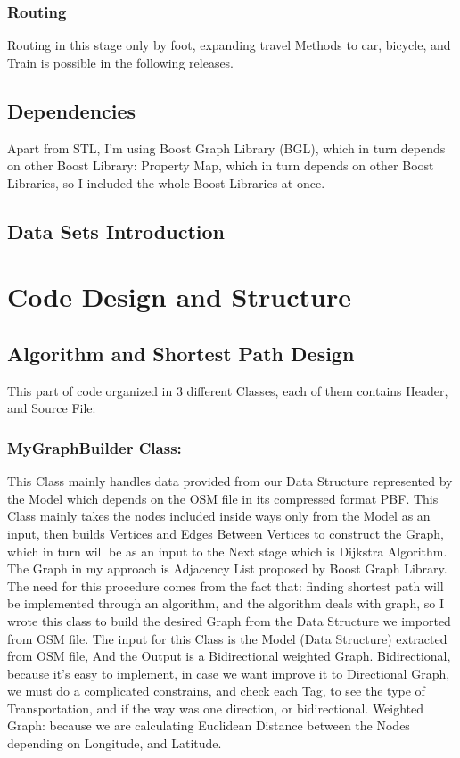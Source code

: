 \documentclass[a4paper,english]{book}
\begin{document}
\subsection{Routing}
Routing in this stage only by foot, expanding travel Methods to car, bicycle, and Train is possible in the following releases. 
\section{Dependencies}
Apart from STL, I’m using Boost Graph Library (BGL), which in turn depends on other Boost Library: Property Map, which in turn depends on other Boost Libraries, so I included the whole Boost Libraries at once.
\section{Data Sets Introduction}







\chapter{Code Design and Structure}
\section{Algorithm and Shortest Path Design}
This part of code organized in 3 different Classes, each of them contains Header, and Source File:
\subsection{ MyGraphBuilder Class:}
This Class mainly handles data provided from our Data Structure represented by the Model which depends on the OSM file in its compressed format PBF.
This Class mainly takes the nodes included inside ways only from the
Model as an input, then builds Vertices and Edges Between Vertices to construct the Graph, which in turn will be as an input to the Next stage which is Dijkstra Algorithm.
The Graph in my approach is Adjacency List proposed by Boost Graph Library.
The need for this procedure comes from the fact that: finding shortest path will be implemented through an algorithm, and the algorithm deals with graph, so I wrote this class to build the desired Graph from the Data Structure we imported from OSM file.
The input for this Class is the Model (Data Structure) extracted from OSM file, 
And the Output is a Bidirectional weighted Graph.
Bidirectional, because it’s easy to implement, in case we want improve it to Directional Graph, we must do a complicated constrains, and check each Tag, to see the type of Transportation, and if the way was one direction, or bidirectional.
Weighted Graph: because we are calculating Euclidean Distance between the Nodes depending on Longitude, and Latitude.
\end{document}
